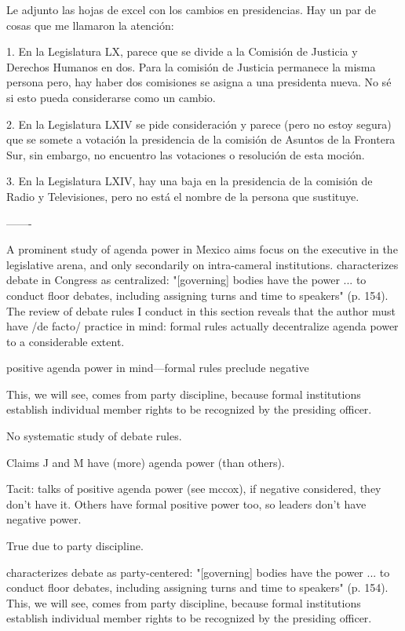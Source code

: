 
Le adjunto las hojas de excel con los cambios en presidencias. Hay un par de cosas que me llamaron la atención: 

1. En la Legislatura LX, parece que se divide a la Comisión de Justicia y Derechos Humanos en dos. Para la comisión de Justicia permanece la misma persona pero, hay haber dos comisiones se asigna a una presidenta nueva. No sé si esto pueda considerarse como un cambio. 

2. En la Legislatura LXIV se pide consideración y parece (pero no estoy segura) que se somete a votación la presidencia de la comisión de Asuntos de la Frontera Sur, sin embargo, no encuentro las votaciones o resolución de esta moción. 

3. En la Legislatura LXIV, hay una baja en la presidencia de la comisión de Radio y Televisiones, pero no está el nombre de la persona que sustituye.

-------

A prominent study of agenda power in Mexico aims focus on the executive in the legislative arena, and only secondarily on intra-cameral institutions. \citet{casar.agsetting.2016} characterizes debate in Congress as centralized: "[governing] bodies have the power ... to conduct floor debates, including assigning turns and time to speakers" (p. 154). The review of debate rules I conduct in this section reveals that the author must have /de facto/ practice in mind: formal rules actually decentralize agenda power to a considerable extent. 

positive agenda power in mind---formal rules preclude negative 


This, we will see, comes from party discipline, because formal institutions establish individual member rights to be recognized by the presiding officer.


No systematic study of debate rules.

Claims J and M have (more) agenda power (than others).

Tacit: talks of positive agenda power (see mccox), if negative considered, they don't have it. Others have formal positive power too, so leaders don't have negative power.

True due to party discipline. 



\citet{casar.agsetting.2016} characterizes debate as party-centered: "[governing] bodies have the power ... to conduct floor debates, including assigning turns and time to speakers" (p. 154). This, we will see, comes from party discipline, because formal institutions establish individual member rights to be recognized by the presiding officer.

